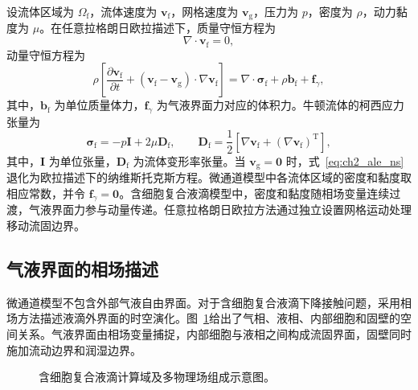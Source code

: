 设流体区域为 $\Omega_{\mathrm f}$，流体速度为 $\boldsymbol{v}_{\mathrm f}$，网格速度为 $\boldsymbol{v}_{\mathrm g}$，压力为 $p$，密度为 $\rho$，动力黏度为 $\mu$。在任意拉格朗日欧拉描述下，质量守恒方程为
\begin{equation}
\nabla\cdot\boldsymbol{v}_{\mathrm f}=0,
\label{eq:ch2_continuity}
\end{equation}
动量守恒方程为
\begin{equation}
\rho
\left[
\frac{\partial \boldsymbol{v}_{\mathrm f}}{\partial t}
+
\left(\boldsymbol{v}_{\mathrm f}-\boldsymbol{v}_{\mathrm g}\right)
\cdot\nabla\boldsymbol{v}_{\mathrm f}
\right]
=
\nabla\cdot\boldsymbol{\sigma}_{\mathrm f}
+
\rho\boldsymbol{b}_{\mathrm f}
+
\boldsymbol{f}_{\gamma},
\label{eq:ch2_ale_ns}
\end{equation}
其中，$\boldsymbol{b}_{\mathrm f}$ 为单位质量体力，$\boldsymbol{f}_{\gamma}$ 为气液界面力对应的体积力。牛顿流体的柯西应力张量为
\begin{equation}
\boldsymbol{\sigma}_{\mathrm f}
=
-p\boldsymbol{I}
+2\mu\boldsymbol{D}_{\mathrm f},
\qquad
\boldsymbol{D}_{\mathrm f}
=
\frac{1}{2}
\left[
\nabla\boldsymbol{v}_{\mathrm f}
+
\left(\nabla\boldsymbol{v}_{\mathrm f}\right)^{\mathrm T}
\right],
\label{eq:ch2_fluid_stress}
\end{equation}
其中，$\boldsymbol{I}$ 为单位张量，$\boldsymbol{D}_{\mathrm f}$ 为流体变形率张量。当 $\boldsymbol{v}_{\mathrm g}=\boldsymbol{0}$ 时，式~\eqref{eq:ch2_ale_ns}退化为欧拉描述下的纳维斯托克斯方程。微通道模型中各流体区域的密度和黏度取相应常数，并令 $\boldsymbol{f}_{\gamma}=\boldsymbol{0}$。含细胞复合液滴模型中，密度和黏度随相场变量连续过渡，气液界面力参与动量传递。任意拉格朗日欧拉方法通过独立设置网格运动处理移动流固边界\cite{hirt1974ale,hughes1981ale,donea2004ale}。

\subsection{气液界面的相场描述}

微通道模型不包含外部气液自由界面。对于含细胞复合液滴下降接触问题，采用相场方法描述液滴外界面的时空演化。图~\ref{fig:ch2_multiphysics_domains}给出了气相、液相、内部细胞和固壁的空间关系。气液界面由相场变量捕捉，内部细胞与液相之间构成流固界面，固壁同时施加流动边界和润湿边界。

\begin{figure}[htbp]
  \centering
  
  \caption{含细胞复合液滴计算域及多物理场组成示意图。}
  \label{fig:ch2_multiphysics_domains}
\end{figure}

